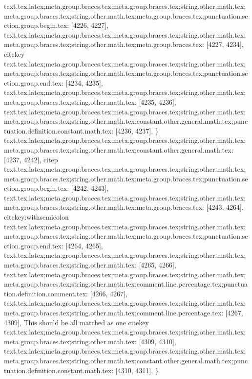 {{{{{{{{{{{{{{{{{{{{{{{{{{{{{{{{{{{{{{{{{{{{{{{{{{{{{{{{{{{{{{{{{{{{{{{{{{{{{{{{{{{{{{{{{{{{{{{{{{{{{{{{{{{{{{{{{{{{{{{{{{{{{{{{{{{{{{text.tex.latex;meta.group.braces.tex;meta.group.braces.tex;string.other.math.tex;meta.group.braces.tex;string.other.math.tex;meta.group.braces.tex;punctuation.section.group.begin.tex: [4226, 4227], {{}
text.tex.latex;meta.group.braces.tex;meta.group.braces.tex;string.other.math.tex;meta.group.braces.tex;string.other.math.tex;meta.group.braces.tex: [4227, 4234], {citekey}
text.tex.latex;meta.group.braces.tex;meta.group.braces.tex;string.other.math.tex;meta.group.braces.tex;string.other.math.tex;meta.group.braces.tex;punctuation.section.group.end.tex: [4234, 4235], {}}
text.tex.latex;meta.group.braces.tex;meta.group.braces.tex;string.other.math.tex;meta.group.braces.tex;string.other.math.tex: [4235, 4236], {
}
text.tex.latex;meta.group.braces.tex;meta.group.braces.tex;string.other.math.tex;meta.group.braces.tex;string.other.math.tex;constant.other.general.math.tex;punctuation.definition.constant.math.tex: [4236, 4237], {\}
text.tex.latex;meta.group.braces.tex;meta.group.braces.tex;string.other.math.tex;meta.group.braces.tex;string.other.math.tex;constant.other.general.math.tex: [4237, 4242], {citep}
text.tex.latex;meta.group.braces.tex;meta.group.braces.tex;string.other.math.tex;meta.group.braces.tex;string.other.math.tex;meta.group.braces.tex;punctuation.section.group.begin.tex: [4242, 4243], {{}
text.tex.latex;meta.group.braces.tex;meta.group.braces.tex;string.other.math.tex;meta.group.braces.tex;string.other.math.tex;meta.group.braces.tex: [4243, 4264], {citekey:withsemicolon}
text.tex.latex;meta.group.braces.tex;meta.group.braces.tex;string.other.math.tex;meta.group.braces.tex;string.other.math.tex;meta.group.braces.tex;punctuation.section.group.end.tex: [4264, 4265], {}}
text.tex.latex;meta.group.braces.tex;meta.group.braces.tex;string.other.math.tex;meta.group.braces.tex;string.other.math.tex: [4265, 4266], { }
text.tex.latex;meta.group.braces.tex;meta.group.braces.tex;string.other.math.tex;meta.group.braces.tex;string.other.math.tex;comment.line.percentage.tex;punctuation.definition.comment.tex: [4266, 4267], {%
text.tex.latex;meta.group.braces.tex;meta.group.braces.tex;string.other.math.tex;meta.group.braces.tex;string.other.math.tex;comment.line.percentage.tex: [4267, 4309], { This should be all matched as one citekey}
text.tex.latex;meta.group.braces.tex;meta.group.braces.tex;string.other.math.tex;meta.group.braces.tex;string.other.math.tex: [4309, 4310], {
}
text.tex.latex;meta.group.braces.tex;meta.group.braces.tex;string.other.math.tex;meta.group.braces.tex;string.other.math.tex;constant.other.general.math.tex;punctuation.definition.constant.math.tex: [4310, 4311], {\}
}}}}}}}}}}}}}}}}}}}}}}}}}}}}}}}}}}}}}}}}}}}}}}}}}}}}}}}}}}}}}}}}}}}}}}}}}}}}}}}}}}}}}}}}}}}}}}}}}}}}}}}}}}}}}}}}}}}}}}}}}}}}}}}}}}}}}}}}}
